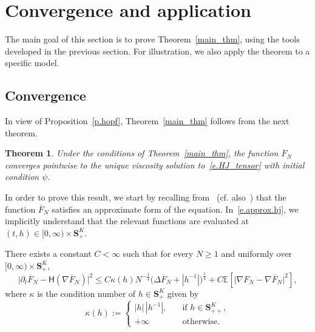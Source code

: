 \documentclass[10pt]{amsart}
\newtheorem{theo}{Theorem}[section]
\theoremstyle{definition}\newtheorem{defi}[theo]{Definition}\newtheorem{rema}[theo]{Remark}\newtheorem{exam}[theo]{Example}\newtheorem{exem}[theo]{Example}\newtheorem{nota}[theo]{Notation}
\newcommand{\E}{\mathbb{E}}
\renewcommand{\S}{\mathbf{S}}
\renewcommand{\H}{\mathsf{H}}
\renewcommand{\ge}{\geqslant}
\renewcommand{\leq}{\leqslant}
\renewcommand{\bar}{\overline}
\newcommand{\Ll}{\left}
\newcommand{\Rr}{\right}
\begin{document}
\section{Convergence and application}\label{s.proof}


The main goal of this section is to prove Theorem~\ref{main_thm}, using the tools developed in the previous section. For illustration, we also apply the theorem to a specific model.



\subsection{Convergence}

In view of Proposition~\ref{p.hopf}, Theorem~\ref{main_thm} follows from the next theorem.

\begin{theo}\label{t.cvg}
Under the conditions of Theorem~\ref{main_thm}, the function $\bar F_N$ converges pointwise to the unique viscosity solution to~\eqref{e.HJ_tensor} with initial condition $\psi$.
\end{theo}

In order to prove this result, we start by recalling from~\cite[Proposition~3.1]{HBJ} (cf. also~\cite[Proposition~1.2]{mourrat2019hamilton}) that the function $\bar F_N$ satisfies an approximate form of the equation. In~\eqref{e.approx.hj}, we implicitly understand that the relevant functions are evaluated at $(t,h) \in [0,\infty) \times \S^K_+$.
\begin{prop}\label{p.approx.hj}
There exists a constant $C < \infty$ such that for every $N \ge 1$ and uniformly over $[0,\infty) \times \S^K_+$,
\begin{equation}\label{e.approx.hj}
\big|\partial_t\bar F_N-\H\Ll(\nabla\bar F_N\Rr)\big|^2\leq C\kappa(h)N^{-\frac{1}{4}}\big(\Delta \bar F_N+\Ll|h^{-1}\Rr|\big)^{\frac{1}{4}}+C\E\Ll[\big|\nabla F_N-\nabla \bar F_N\big|^2\Rr],
\end{equation}
where $\kappa$ is the condition number of $h\in \S^K_+$ given by
\begin{equation*}
\kappa(h) :=
\begin{cases}
|h|\,\Ll|h^{-1}\Rr|, &\quad\text{if }h\in \S^K_{++}, \\
+\infty &\quad\text{otherwise}.
\end{cases}
\end{equation*}
\end{prop}
\end{document}
